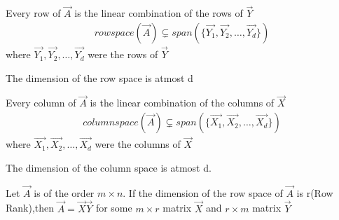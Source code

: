 \documentclass[journal,12pt,twocolumn]{IEEEtran}
\begin{document}
Every row of $\vec{A}$ is the linear combination of the rows of $\vec{Y}$
\begin{align}
    rowspace(\vec{A})\subsetneq span(\{\vec{Y_1},\vec{Y_2},\dots,\vec{Y_d}\})
\end{align}
where $\vec{Y_1},\vec{Y_2},\dots,\vec{Y_d}$ were the rows of $\vec{Y}$

The dimension of the row space is atmost d

Every column of $\vec{A}$ is the linear combination of the columns of $\vec{X}$
\begin{align}
    columnspace(\vec{A})\subsetneq span(\{\vec{X_1},\vec{X_2},\dots,\vec{X_d}\})
\end{align}
where $\vec{X_1},\vec{X_2},\dots,\vec{X_d}$ were the columns of $\vec{X}$

The dimension of the column space is atmost d.

Let $\vec{A}$ is of the order $m \times n$. If the dimension of the row space of $\vec{A}$ is r(Row Rank),then $\vec{A}=\vec{X}\vec{Y}$ for some $m \times r$ matrix $\vec{X}$ and $r \times m$ matrix $\vec{Y}$
\end{document}

